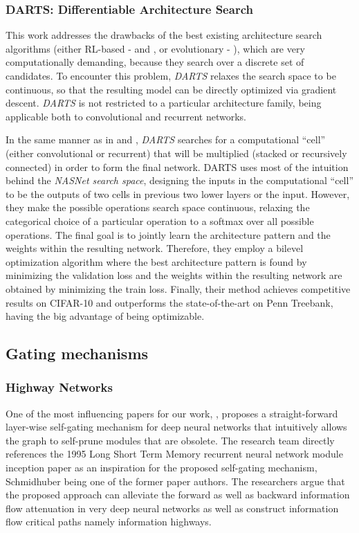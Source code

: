 \documentclass[11pt,a4paper]{article}
\begin{document}
\subsubsection{DARTS: Differentiable Architecture Search}
\label{summary:darts}

This work \citep{Liu2018} addresses the drawbacks of the best existing architecture search algorithms (either RL-based - \citet{Zoph2017} and \citet{Zoph2018}, or evolutionary - \citet{Real2018}), which are very computationally demanding, because they search over a discrete set of candidates. To encounter this problem, \textit{DARTS} relaxes the search space to be continuous, so that the resulting model can be directly optimized via gradient descent. \textit{DARTS} is not restricted to a particular architecture family, being applicable both to convolutional and recurrent networks.

In the same manner as in \citet{Zoph2018} and \citet{Real2018}, \textit{DARTS} searches for a computational “cell” (either convolutional or recurrent) that will be multiplied (stacked or recursively connected) in order to form the final network. DARTS uses most of the intuition behind the \textit{NASNet search space}, designing the inputs in the computational “cell” to be the outputs of two cells in previous two lower layers or the input. However, they make the possible operations search space continuous, relaxing the categorical choice of a particular operation to a softmax over all possible operations. The final goal is to jointly learn the architecture pattern and the weights within the resulting network. Therefore, they employ a bilevel optimization algorithm where the best architecture pattern is found by minimizing the validation loss and the weights within the resulting network are obtained by minimizing the train loss. Finally, their method achieves competitive results on CIFAR-10 and outperforms the state-of-the-art on Penn Treebank, having the big advantage of being optimizable.


\subsection{Gating mechanisms}

\subsubsection{Highway Networks}
\label{summary:highway}

One of the most influencing papers for our work, \citet{srivastava2015highway}, proposes a straight-forward layer-wise self-gating mechanism for deep neural networks that intuitively allows the graph to self-prune modules that are obsolete. The research team directly references the 1995 Long Short Term Memory recurrent neural network module inception paper \citep{Hochreiter1997} as an inspiration for the proposed self-gating mechanism, Schmidhuber being one of the former paper authors. The researchers argue that the proposed approach can alleviate the forward as well as backward information flow attenuation in very deep neural networks as well as construct information flow critical paths namely information highways. 
\end{document}
